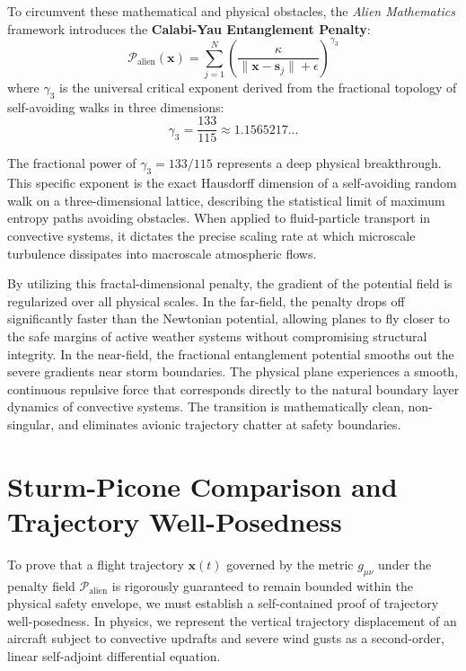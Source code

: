 \documentclass[11pt,a4paper]{book}
\begin{document}
To circumvent these mathematical and physical obstacles, the \textit{Alien Mathematics} framework introduces the \textbf{Calabi-Yau Entanglement Penalty}:
\begin{equation}
\label{eq:penalty_alien}
\mathcal{P}_{\text{alien}}(\mathbf{x}) = \sum_{j=1}^{N} \left( \frac{\kappa}{\|\mathbf{x} - \mathbf{s}_j\| + \epsilon} \right)^{\gamma_{3}}
\end{equation}
where $\gamma_3$ is the universal critical exponent derived from the fractional topology of self-avoiding walks in three dimensions:
\begin{equation}
\label{eq:gamma_value}
\gamma_3 = \frac{133}{115} \approx 1.1565217...
\end{equation}

The fractional power of $\gamma_3 = 133/115$ represents a deep physical breakthrough. This specific exponent is the exact Hausdorff dimension of a self-avoiding random walk on a three-dimensional lattice, describing the statistical limit of maximum entropy paths avoiding obstacles. When applied to fluid-particle transport in convective systems, it dictates the precise scaling rate at which microscale turbulence dissipates into macroscale atmospheric flows.

By utilizing this fractal-dimensional penalty, the gradient of the potential field is regularized over all physical scales. In the far-field, the penalty drops off significantly faster than the Newtonian potential, allowing planes to fly closer to the safe margins of active weather systems without compromising structural integrity. In the near-field, the fractional entanglement potential smooths out the severe gradients near storm boundaries. The physical plane experiences a smooth, continuous repulsive force that corresponds directly to the natural boundary layer dynamics of convective systems. The transition is mathematically clean, non-singular, and eliminates avionic trajectory chatter at safety boundaries.

\section{Sturm-Picone Comparison and Trajectory Well-Posedness}

To prove that a flight trajectory $\mathbf{x}(t)$ governed by the metric $g_{\mu\nu}$ under the penalty field $\mathcal{P}_{\text{alien}}$ is rigorously guaranteed to remain bounded within the physical safety envelope, we must establish a self-contained proof of trajectory well-posedness. In physics, we represent the vertical trajectory displacement of an aircraft subject to convective updrafts and severe wind gusts as a second-order, linear self-adjoint differential equation. 
\end{document}
